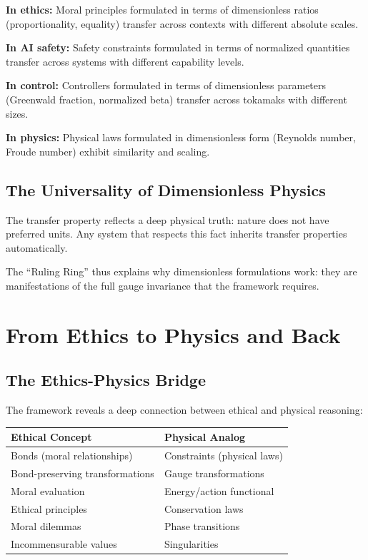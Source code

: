 \documentclass[12pt]{article}
\begin{document}
\textbf{In ethics:} Moral principles formulated in terms of dimensionless ratios (proportionality, equality) transfer across contexts with different absolute scales.

\textbf{In AI safety:} Safety constraints formulated in terms of normalized quantities transfer across systems with different capability levels.

\textbf{In control:} Controllers formulated in terms of dimensionless parameters (Greenwald fraction, normalized beta) transfer across tokamaks with different sizes.

\textbf{In physics:} Physical laws formulated in dimensionless form (Reynolds number, Froude number) exhibit similarity and scaling.

\subsection{The Universality of Dimensionless Physics}

The transfer property reflects a deep physical truth: nature does not have preferred units. Any system that respects this fact inherits transfer properties automatically.

The ``Ruling Ring'' thus explains why dimensionless formulations work: they are manifestations of the full gauge invariance that the framework requires.

\section{From Ethics to Physics and Back}

\subsection{The Ethics-Physics Bridge}

The framework reveals a deep connection between ethical and physical reasoning:

\begin{table}[h]
\centering
\begin{tabular}{ll}
\toprule
\textbf{Ethical Concept} & \textbf{Physical Analog} \\
\midrule
Bonds (moral relationships) & Constraints (physical laws) \\
Bond-preserving transformations & Gauge transformations \\
Moral evaluation & Energy/action functional \\
Ethical principles & Conservation laws \\
Moral dilemmas & Phase transitions \\
Incommensurable values & Singularities \\
\bottomrule
\end{tabular}
\end{table}
\end{document}
